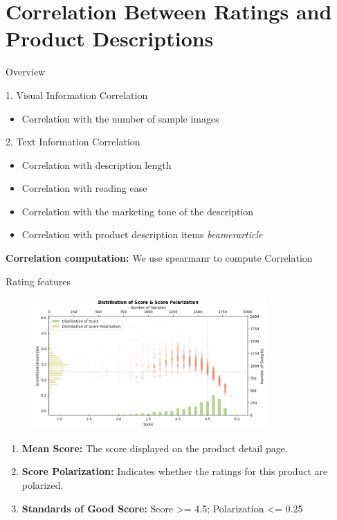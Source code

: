 \section{Correlation Between Ratings and Product Descriptions}

\begin{frame}{Overview}
    
	\begin{block}{1. Visual Information Correlation}
		\begin{itemize}
			\item Correlation with the number of sample images
		\end{itemize}
	\end{block}
    
	\begin{block}{2. Text Information Correlation}
		\begin{itemize}
			\item Correlation with description length
			\item Correlation with reading ease
			\item Correlation with the marketing tone of the description
            \item Correlation with product description items
            \emph{beamerarticle}
		\end{itemize}
	\end{block}

    \textbf{Correlation computation:} We use spearmanr to compute Correlation
\end{frame}

\begin{frame}{Rating features}

	\begin{figure}
		\centering
			\includegraphics[height=5cm]{pic/score-scatter.png}
	\end{figure}

    \begin{enumerate}
        \item \textbf{Mean Score:} The score displayed on the product detail page.
        \item \textbf{Score Polarization:} Indicates whether the ratings for this product are polarized.
        \item \textbf{Standards of Good Score:} Score >= 4.5; Polarization <= 0.25
    \end{enumerate}

\end{frame}
